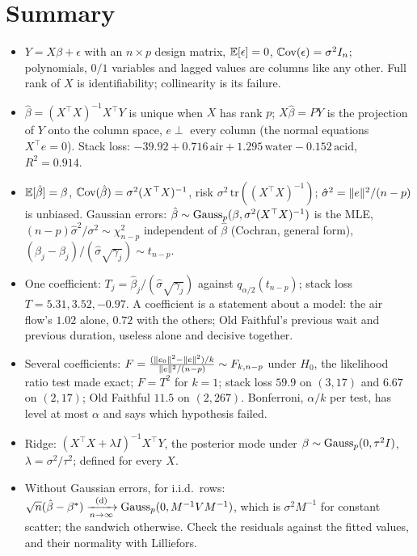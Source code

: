 \section{Summary}
\label{sec:mreg-summary}

\begin{itemize}[nosep]
\item $Y = X\beta + \epsilon$ with an $n \times p$ design matrix, $\operatorname*{\mathbb{E}}[\epsilon] = 0$, $\operatorname*{\mathbb{C}\text{ov}}(\epsilon) = \sigma^2I_n$; polynomials, $0/1$ variables and lagged values are columns like any other. Full rank of $X$ is identifiability; collinearity is its failure.
\item $\hat{\beta} = (X^\top X)^{-1}X^\top Y$ is unique when $X$ has rank $p$; $X\hat{\beta} = PY$ is the projection of $Y$ onto the column space, $e \perp$ every column (the normal equations $X^\top e = 0$). Stack loss: $-39.92 + 0.716\,\text{air} + 1.295\,\text{water} - 0.152\,\text{acid}$, $R^2 = 0.914$.
\item $\operatorname*{\mathbb{E}}[\hat{\beta}] = \beta$, $\operatorname*{\mathbb{C}\text{ov}}(\hat{\beta}) = \sigma^2(X^\top X)^{-1}$, risk $\sigma^2\,\mathrm{tr}((X^\top X)^{-1})$; $\hat{\sigma}^2 = \lVert e\rVert^2/(n - p)$ is unbiased. Gaussian errors: $\hat{\beta} \sim \text{Gauss}_p(\beta, \sigma^2(X^\top X)^{-1})$ is the MLE, $(n - p)\hat{\sigma}^2/\sigma^2 \sim \chi^2_{n-p}$ independent of $\hat{\beta}$ (Cochran, general form), $(\hat{\beta}_j - \beta_j)/(\hat{\sigma}\sqrt{\gamma_j}) \sim t_{n-p}$.
\item One coefficient: $T_j = \hat{\beta}_j/(\hat{\sigma}\sqrt{\gamma_j})$ against $q_{\alpha/2}(t_{n-p})$; stack loss $T = 5.31, 3.52, -0.97$. A coefficient is a statement about a model: the air flow's $1.02$ alone, $0.72$ with the others; Old Faithful's previous wait and previous duration, useless alone and decisive together.
\item Several coefficients: $F = \frac{(\lVert e_0\rVert^2 - \lVert e\rVert^2)/k}{\lVert e\rVert^2/(n - p)} \sim F_{k, n-p}$ under $H_0$, the likelihood ratio test made exact; $F = T^2$ for $k = 1$; stack loss $59.9$ on $(3, 17)$ and $6.67$ on $(2, 17)$; Old Faithful $11.5$ on $(2, 267)$. Bonferroni, $\alpha/k$ per test, has level at most $\alpha$ and says which hypothesis failed.
\item Ridge: $(X^\top X + \lambda I)^{-1}X^\top Y$, the posterior mode under $\beta \sim \text{Gauss}_p(0, \tau^2I)$, $\lambda = \sigma^2/\tau^2$; defined for every $X$.
\item Without Gaussian errors, for i.i.d.\ rows: $\sqrt{n}(\hat{\beta} - \beta^*) \xrightarrow [n \to \infty ]{\text{(d)}} \text{Gauss}_p(0, M^{-1}VM^{-1})$, which is $\sigma^2M^{-1}$ for constant scatter; the sandwich otherwise. Check the residuals against the fitted values, and their normality with Lilliefors.
\end{itemize}

